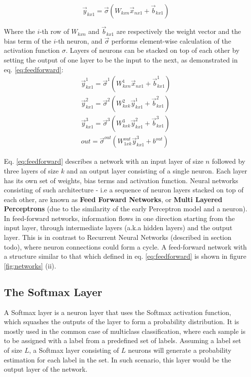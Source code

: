 \begin{equation}
    \vec{y}_{kx1} = \vec{\sigma}({W_{kxn}\vec{x}_{nx1}} + \vec{b}_{kx1})
    \label{eq:neuronlayer}
\end{equation}

Where the \(i\)-th row of \(W_{kxn}\) and \(\vec{b}_{kx1}\) are respectively the weight vector and the bias term of the \(i\)-th neuron, and \(\vec{\sigma}\) performs element-wise calculation of the activation function \(\sigma\). Layers of neurons can be stacked on top of each other by setting the output of one layer to be the input to the next, as demonstrated in eq. \ref{eq:feedforward}:
\begin{equation}
    \begin{split}
    \vec{y}^1_{kx1} = \vec{\sigma}^1({W^1_{kxn}\vec{x}_{nx1}} + \vec{b}^1_{kx1}) \\
    \vec{y}^2_{kx1} = \vec{\sigma}^2({W^2_{kxk}\vec{y}^1_{kx1}} + \vec{b}^2_{kx1}) \\
    \vec{y}^3_{kx1} = \vec{\sigma}^3({W^3_{kxk}\vec{y}^2_{kx1}} + \vec{b}^3_{kx1}) \\
    out = \vec{\sigma}^{out}({W^{out}_{1xk}\vec{y}^3_{kx1}} + b^{out})
    \end{split}
    \label{eq:feedforward}
\end{equation}

Eq. \ref{eq:feedforward} describes a network with an input layer of size \(n\) followed by three layers of size \(k\) and an output layer consisting of a single neuron. Each layer has its own set of weights, bias terms and activation function. Neural networks consisting of such architecture - i.e a sequence of neuron layers stacked on top of each other, are known as \textbf{Feed Forward Networks}, or \textbf{Multi Layered Perceptrons} (due to the similarity of the early Perceptron model and a neuron). In feed-forward networks, information flows in one direction starting from the input layer, through intermediate layers (a.k.a hidden layers) and the output layer. This is in contrast to Recurrent Neural Networks (described in section todo), where neuron connections could form a cycle. A feed-forward network with a structure similar to that which defined in eq. \ref{eq:feedforward} is shown in figure \ref{fig:networks} (ii).

\subsection{The Softmax Layer}
A Softmax layer is a neuron layer that uses the Softmax activation function, which squashes the outputs of the layer to form a probability distribution. It is mostly used in the common case of multiclass classification, where each sample is to be assigned with a label from a predefined set of labels. Assuming a label set of size $L$, a Softmax layer consisting of $L$ neurons will generate a probability estimation for each label in the set. In such scenario, this layer would be the output layer of the network.


